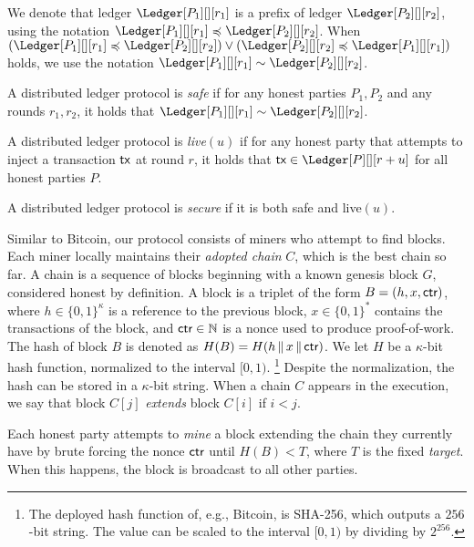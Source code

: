 We denote that ledger
$\Ledger[P_1][][r_1]$ is a prefix of ledger $\Ledger[P_2][][r_2]$,
using the notation
$\Ledger[P_1][][r_1] \preccurlyeq \Ledger[P_2][][r_2]$. When
$(\Ledger[P_1][][r_1] \preccurlyeq \Ledger[P_2][][r_2]) \lor (\Ledger[P_2][][r_2] \preccurlyeq \Ledger[P_1][][r_1])$ holds,
we use the notation $\Ledger[P_1][][r_1] \sim \Ledger[P_2][][r_2]$.

\begin{definition}[Safety]
  A distributed ledger protocol is \emph{safe} if
  for any honest parties $P_1, P_2$ and any rounds $r_1, r_2$, it holds that
  $\Ledger[P_1][][r_1] \sim \Ledger[P_2][][r_2]$.
\end{definition}

\begin{definition}[Liveness]
  A distributed ledger protocol is \emph{live}$(u)$ if
  for any honest party that attempts to inject a transaction $\textsf{tx}$
  at round $r$, it holds that $\tx \in \Ledger[P][][r+u]$
  for all honest parties $P$.
\end{definition}

\begin{definition}[Security]
  A distributed ledger protocol is \emph{secure} if it is
  both safe and live$(u)$.
\end{definition}

\noindent
{}
Similar to Bitcoin, our protocol consists of miners who attempt to find blocks.
Each miner locally maintains their \emph{adopted chain} $C$, which is the best
chain so far. A chain is a sequence of blocks beginning with a known genesis block $G$,
considered honest by definition.
A block is a triplet of the
form $B = (h, x, \textsf{ctr})$, where $h \in \{0,1\}^\kappa$ is a reference to the previous block,
$x \in \{0, 1\}^*$ contains the transactions of the block, and $\textsf{ctr} \in \mathbb{N}$ is a nonce
used to produce proof-of-work.
The hash of block $B$ is denoted as $H(B) = H(h \,\|\, x \,\|\, \textsf{ctr})$.
We let $H$ be a $\kappa$-bit hash function, normalized to the interval
$[0, 1)$.
\footnote{The deployed hash function of, e.g., Bitcoin,
is SHA-256, which outputs a $256$-bit string. The value can be scaled to the interval
$[0, 1)$ by dividing by $2^{256}$.}
Despite the normalization, the hash can be stored in a $\kappa$-bit string.
When a chain $C$ appears in the execution, we say that block $C[j]$ \emph{extends} block $C[i]$
if $i < j$.

Each honest party attempts to \emph{mine} a block extending the chain they currently have
by brute forcing the nonce $\textsf{ctr}$ until $H(B) < T$, where $T$ is the fixed \emph{target}.
When this happens, the block is broadcast to all other parties.

